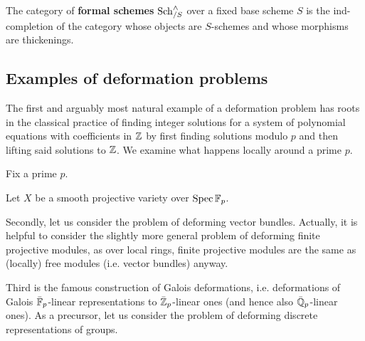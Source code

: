        \begin{definition} \label{def: formal_schemes}
            The category of \textbf{formal schemes} $\mathrm{Sch}_{/S}^{\wedge}$ over a fixed base scheme $S$ is the ind-completion of the category whose objects are $S$-schemes and whose morphisms are thickenings.
        \end{definition}
        \begin{definition} \label{def: versal_miniversal_and_universal_deformations}
            
        \end{definition}

    \subsection{Examples of deformation problems}
        The first and arguably most natural example of a deformation problem has roots in the classical practice of finding integer solutions for a system of polynomial equations with coefficients in $\mathbb{Z}$ by first finding solutions modulo $p$ and then lifting said solutions to $\mathbb{Z}$. We examine what happens locally around a prime $p$.
        \begin{example}
            Fix a prime $p$.
        
            Let $X$ be a smooth projective variety over $\operatorname{Spec} \mathbb{F}_p$.  
        \end{example}

        Secondly, let us consider the problem of deforming vector bundles. Actually, it is helpful to consider the slightly more general problem of deforming finite projective modules, as over local rings, finite projective modules are the same as (locally) free modules (i.e. vector bundles) anyway.
        \begin{example}
            
        \end{example}

        Third is the famous construction of Galois deformations, i.e. deformations of Galois $\bar{\mathbb{F}}_p$-linear representations to $\bar{\mathbb{Z}}_p$-linear ones (and hence also $\bar{\mathbb{Q}}_p$-linear ones). As a precursor, let us consider the problem of deforming discrete representations of groups.
        \begin{example}
            
        \end{example}
        \begin{example}
            
        \end{example}

